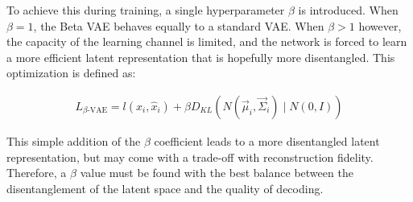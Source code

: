 To achieve this during training, a single hyperparameter $\beta$ is
introduced. When $\beta = 1$, the Beta VAE behaves equally to a
standard VAE. When $\beta > 1$ however, the capacity of the learning
channel is limited, and the network is forced to learn a more
efficient latent representation that is hopefully more disentangled.
This optimization is defined as:

\begin{align*}
    L_{\beta \text{-VAE}} = l(x_i, \hat{x}_i) + \beta D_{KL}(N(\vec{\mu}_i, \vec{\Sigma}_i) \mid N(0,I))
\end{align*}

This simple addition of the $\beta$ coefficient leads to a more
disentangled latent representation, but may come with a trade-off
with reconstruction fidelity. Therefore, a $\beta$ value must be
found with the best balance between the disentanglement of the latent
space and the quality of decoding.